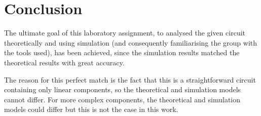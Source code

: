 \section{Conclusion}
\label{sec:conclusion}


The ultimate goal of this laboratory assignment, to analysed 
the given circuit theoretically and using simulation (and consequently
familiarising the group with the tools used), has been achieved, since
the simulation results matched the theoretical results with great accuracy. 


The reason for this perfect match is the fact that this is a
straightforward circuit containing only linear components, so the theoretical
and simulation models cannot differ. For more complex components, the
theoretical and simulation models could differ but this is not the case in this
work.

